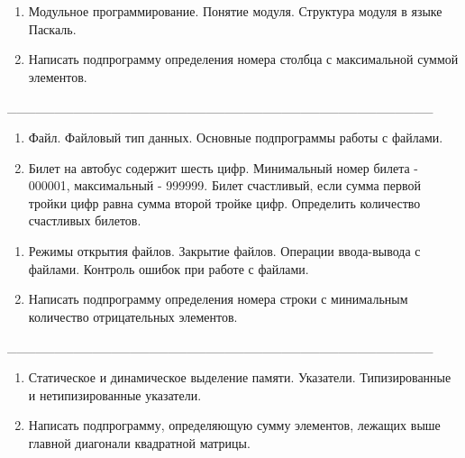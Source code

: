 \documentclass[oneside, final, 14pt]{extreport}
\begin{document}

\begin{enumerate}
\item Модульное программирование. Понятие модуля. Структура модуля в языке Паскаль.
\item Написать подпрограмму определения номера столбца с максимальной суммой элементов.
\end{enumerate}


\_\_\_\_\_\_\_\_\_\_\_\_\_\_\_\_\_\_\_\_\_\_\_\_\_\_\_\_\_\_\_\_\_\_\_\_\_\_\_\_\_\_\_\_\_


\begin{enumerate}
\item Файл. Файловый тип данных. Основные подпрограммы работы с файлами.
\item Билет на автобус содержит шесть цифр. Минимальный номер билета - 000001, максимальный - 999999. Билет счастливый, если сумма первой тройки цифр равна сумма второй тройке цифр.
Определить количество счастливых билетов.
\end{enumerate}


\newpage


\begin{enumerate}
\item Режимы открытия файлов. Закрытие файлов. Операции ввода-вывода с файлами.
Контроль ошибок при работе с файлами.
\item Написать подпрограмму определения номера строки с минимальным количество отрицательных элементов.
\end{enumerate}


\_\_\_\_\_\_\_\_\_\_\_\_\_\_\_\_\_\_\_\_\_\_\_\_\_\_\_\_\_\_\_\_\_\_\_\_\_\_\_\_\_\_\_\_\_


\begin{enumerate}
\item Статическое и динамическое выделение памяти. Указатели. Типизированные и нетипизированные указатели.
\item Написать подпрограмму, определяющую сумму элементов, лежащих выше главной диагонали 
квадратной матрицы.
\end{enumerate}

\end{document}
